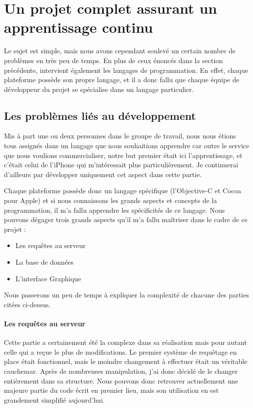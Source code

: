 \documentclass{article}
\begin{document}
\section{Un projet complet assurant un apprentissage continu}

Le sujet est simple, mais nous avons cependant soulevé un certain nombre de problèmes en très peu de temps. En plus de ceux énoncés dans la section précédente, intervient également les langages de programmation. En effet, chaque plateforme possède son propre langage, et il a donc fallu que chaque équipe de développeur du projet se spécialise dans un langage particulier. 

\subsection{Les problèmes liés au développement}
Mis à part une ou deux personnes dans le groupe de travail, nous nous étions tous assignés dans un langage que nous souhaitions apprendre car outre le service que nous voulions commercialiser, notre but premier était ici l'apprentissage, et c'était celui de l'iPhone qui m'intéressait plus particulièrement. Je continuerai d'ailleurs par développer uniquement cet aspect dans cette partie.

Chaque plateforme possède donc un langage spécifique (l'Objective-C et Cocoa pour Apple) et si nous connaissons les grands aspects et concepts de la programmation, il m'a fallu apprendre les spécificités de ce langage. Nous pouvons dégager trois grands aspects qu'il m'a fallu maîtriser dans le cadre de ce projet : 
\begin{itemize}
	\item Les requêtes au serveur
	\item La base de données
	\item L'interface Graphique
\end{itemize}
Nous passerons un peu de temps à expliquer la complexité de chacune des parties citées ci-dessus.
		\paragraph{Les requêtes au serveur}
		Cette partie a certainement été la complexe dans sa réalisation mais pour autant celle qui a  re\c cue le plus de modifications. Le premier système de requêtage en place était fonctionnel, mais le moindre changement à effectuer était un véritable cauchemar. Après de nombreuses manipulation, j'ai donc décidé de le changer entièrement dans sa structure. Nous pouvons donc retrouver actuellement une majeure partie du code écrit en premier lieu, mais son utilisation en est grandement simplifié aujourd'hui.
		
\end{document}
